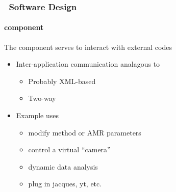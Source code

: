 \begin{frame}[fragile] 
\frametitle{\cello\ Software Design}
\framesubtitle{ component}
The  component serves to interact with external codes \\
\begin{itemize}
\item{} Inter-application communication analagous to 
\begin{itemize}
\item{}    Probably XML-based
\item{}    Two-way
\end{itemize}
\item{} Example uses
\begin{itemize}
\item{} modify method or AMR parameters
\item{} control a virtual ``camera''
\item{} dynamic data analysis
\item{} plug in jacques, yt, etc.
\end{itemize}
\end{itemize}
\end{frame}
%
%
%
